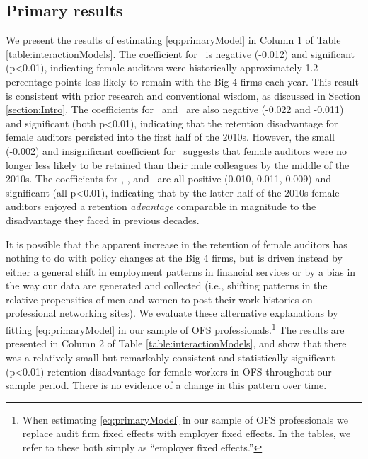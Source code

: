 \documentclass[11pt]{article}
\begin{document}
    \subsection{Primary results}\label{section:primaryResults}
        We present the results of estimating \ref{eq:primaryModel} in Column 1 of Table \ref{table:interactionModels}. The coefficient for \FEMALExPREX\ is negative (-0.012) and significant (p<0.01), indicating female auditors were historically approximately 1.2 percentage points less likely to remain with the Big 4 firms each year. This result is consistent with prior research and conventional wisdom, as discussed in Section \ref{section:Intro}. The coefficients for \FEMALExXtoXI\ and \FEMALExXIItoXIII\ are also negative (-0.022 and -0.011) and significant (both p<0.01), indicating that the retention disadvantage for female auditors persisted into the first half of the 2010s. However, the small (-0.002) and insignificant coefficient for \FEMALExXIVtoXV\ suggests that female auditors were no longer less likely to be retained than their male colleagues by the middle of the 2010s. The coefficients for \FEMALExXVItoXVII, \FEMALExXVIIItoXIX, and \FEMALExPOSTXIX\ are all positive (0.010, 0.011, 0.009) and significant (all p<0.01), indicating that by the latter half of the 2010s female auditors enjoyed a retention \textit{advantage} comparable in magnitude to the disadvantage they faced in previous decades. 

        It is possible that the apparent increase in the retention of female auditors has nothing to do with policy changes at the Big 4 firms, but is driven instead by either a general shift in employment patterns in financial services or by a bias in the way our data are generated and collected (i.e., shifting patterns in the relative propensities of men and women to post their work histories on professional networking sites). We evaluate these alternative explanations by fitting \ref{eq:primaryModel} in our sample of OFS professionals.\footnote{When estimating \ref{eq:primaryModel} in our sample of OFS professionals we replace audit firm fixed effects with employer fixed effects. In the tables, we refer to these both simply as ``employer fixed effects.''} The results are presented in Column 2 of Table \ref{table:interactionModels}, and show that there was a relatively small but remarkably consistent and statistically significant (p<0.01) retention disadvantage for female workers in OFS throughout our sample period. There is no evidence of a change in this pattern over time. 
        
\end{document}
